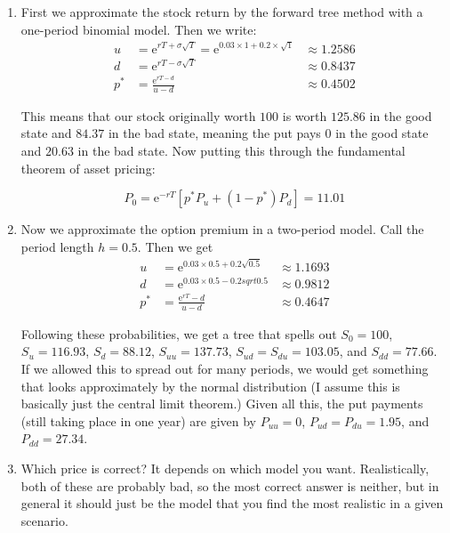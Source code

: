 \documentclass[12pt, letterpaper]{article}
\newcommand{\e}{\mathrm{e}}
\begin{document}
    \begin{enumerate}
    \item First we approximate the stock return by the forward tree method with a one-period binomial model. Then we write:
    \begin{align*}
    u &= \e^{rT + \sigma \sqrt{T}} = \e^{0.03 \times 1 + 0.2 \times \sqrt{1}} &\approx 1.2586 \\
    d &= \e^{rT - \sigma \sqrt{T}} &\approx 0.8437 \\
    p^* &= \frac{\e^{rT - d}}{u - d} &\approx 0.4502
    \end{align*}

    This means that our stock originally worth \(100\) is worth \(125.86\) in the good state and \(84.37\) in the bad state, meaning the put pays \(0\) in the good state and \(20.63\) in the bad state. Now putting this through the fundamental theorem of asset pricing:

    \[ P_0 = \e^{-rT} \left[ p^* P_u + (1 - p^*) P_d \right] = 11.01   \]

    \item Now we approximate the option premium in a two-period model. Call the period length \(h = 0.5\). Then we get
    \begin{align*}
    u &= \e^{0.03 \times 0.5 + 0.2 \sqrt{0.5}} &\approx 1.1693 \\
    d &= \e^{0.03 \times 0.5 - 0.2 sqrt{0.5}} &\approx 0.9812 \\
    p^* &= \frac{\e^{rT} - d}{u - d} &\approx 0.4647
    \end{align*}

    Following these probabilities, we get a tree that spells out \(S_0 = 100\), \(S_u = 116.93\), \(S_d = 88.12\), \(S_{uu} = 137.73\), \(S_{ud} = S_{du} = 103.05\), and \(S_{dd} = 77.66\). If we allowed this to spread out for many periods, we would get something that looks approximately by the normal distribution (I assume this is basically just the central limit theorem.) Given all this, the put payments (still taking place in one year) are given by \(P_{uu} = 0\), \(P_{ud} = P_{du} = 1.95\), and \(P_{dd} = 27.34\). 

    \item Which price is correct? It depends on which model you want. Realistically, both of these are probably bad, so the most correct answer is neither, but in general it should just be the model that you find the most realistic in a given scenario.
    

\end{enumerate}
\end{document}
